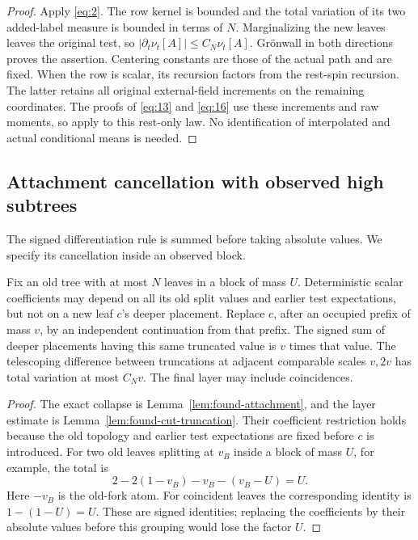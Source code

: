 \begin{proof}
Apply \eqref{eq:2}. The row kernel is bounded and the total
variation of its two added-label measure is bounded in terms of
\(N\). Marginalizing the new leaves leaves the original test,
so \(|\partial_t\nu_t[A]|\le C_N\nu_t[A]\). Gr\"onwall in both
directions proves the assertion. Centering constants are those
of the actual path and are fixed. When the row is scalar, its
recursion factors from the rest-spin recursion. The latter
retains all original external-field increments on the remaining
coordinates. The proofs of \eqref{eq:13} and \eqref{eq:16} use
these increments and raw moments, so apply to this rest-only law.
No identification of interpolated and actual conditional means
is needed.
\end{proof}

\subsection{Attachment cancellation with observed high subtrees}

The signed differentiation rule is summed before taking absolute
values. We specify its cancellation inside an observed block.

\begin{lemma}\label{lem:cavity-truncation}
Fix an old tree with at most \(N\) leaves in a block of mass \(U\).
Deterministic scalar coefficients may depend on all its old
split values and earlier test expectations, but not on a new
leaf \(c\)'s deeper placement. Replace \(c\), after an occupied
prefix of mass \(v\), by an independent continuation from that
prefix. The signed sum of deeper placements having this same
truncated value is \(v\) times that value. The telescoping
difference between truncations at adjacent comparable scales
\(v,2v\) has total variation at most \(C_Nv\). The final layer
may include coincidences.
\end{lemma}

\begin{proof}
The exact collapse is Lemma~\ref{lem:found-attachment}, and the
layer estimate is Lemma~\ref{lem:found-cut-truncation}. Their
coefficient restriction holds because the old topology and earlier
test expectations are fixed before \(c\) is introduced.
For two old leaves splitting at \(v_B\) inside a block of
mass \(U\), for example, the total is
\[
                  2-2(1-v_B)-v_B-(v_B-U)=U.
\]
Here \(-v_B\) is the old-fork atom. For coincident leaves
the corresponding identity is \(1-(1-U)=U\).
These are signed identities; replacing the coefficients by their
absolute values before this grouping would lose the factor \(U\).
\end{proof}

